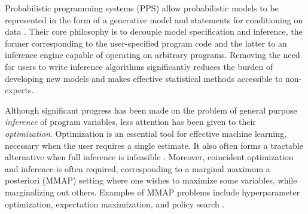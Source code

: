 

Probabilistic programming systems (PPS) allow probabilistic models to be represented in the form of a generative model and statements for conditioning on data \citep{carpenter2015stan,goodman_uai_2008,goodman_book_2014,mansinghka2014venture,minka_software_2010,wood2014new}.  
Their core philosophy is to decouple model specification and inference, the former corresponding to the user-specified program code and the latter to an inference engine capable of operating on arbitrary programs.  Removing the need for users to write inference algorithms significantly reduces the burden of developing new models and makes effective statistical methods accessible to non-experts.

Although significant progress has been made on the problem of general purpose \emph{inference} of program variables, less attention has been given to their \emph{optimization}.  Optimization is an essential tool for effective machine learning, necessary when the user requires a single estimate. It also often forms a tractable alternative when full inference is infeasible \citep{murphy2012machine}.  Moreover, coincident optimization and inference is often required, corresponding to a marginal maximum a posteriori (MMAP) setting where one wishes to maximize some variables, while marginalizing out others.  Examples of MMAP problems include hyperparameter optimization, expectation maximization, and policy search \citep{van2015black}.



